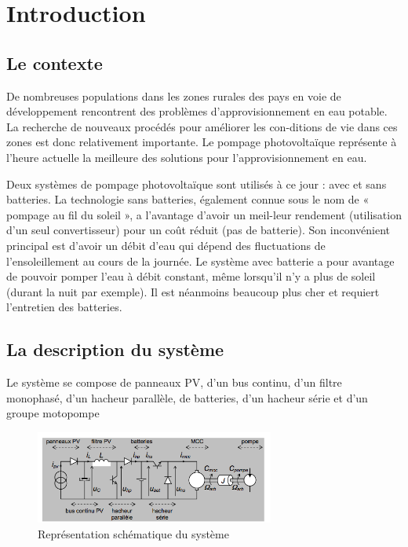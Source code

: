 \section{Introduction}
\subsection{Le contexte}

De nombreuses populations dans les zones rurales des pays en voie de développement rencontrent des problèmes d’approvisionnement en eau potable. La recherche de nouveaux procédés pour améliorer les con-ditions de vie dans ces zones est donc relativement importante. Le pompage photovoltaïque représente à l’heure actuelle la meilleure des solutions pour l’approvisionnement en eau.

Deux systèmes de pompage photovoltaïque sont utilisés à ce jour : avec et sans batteries. La technologie sans batteries, également connue sous le nom de « pompage au fil du soleil », a l’avantage d’avoir un meil-leur rendement (utilisation d’un seul convertisseur) pour un coût réduit (pas de batterie). Son inconvénient principal est d’avoir un débit d’eau qui dépend des fluctuations de l’ensoleillement au cours de la journée. Le système avec batterie a pour avantage de pouvoir pomper l’eau à débit constant, même lorsqu’il n’y a plus de soleil (durant la nuit par exemple). Il est néanmoins beaucoup plus cher et requiert l’entretien des batteries.


\subsection{La description du système}

Le système se compose de panneaux PV, d’un bus continu, d’un filtre monophasé, d’un hacheur parallèle, de batteries, d’un hacheur série et d’un groupe motopompe 

\begin{figure}[ht]
	\begin{center}
	\includegraphics[width=0.7\textwidth]{images/Systeme.png}
	\caption{Représentation schématique du système}\label{img:Schéma système EnRE}
	\end{center}
\end{figure}
\FloatBarrier 


